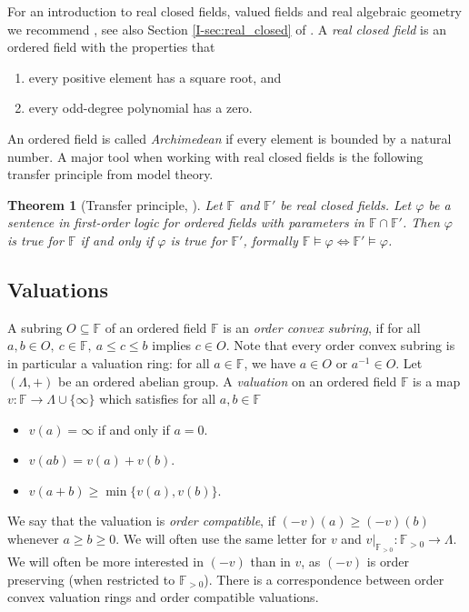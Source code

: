 \documentclass[12pt]{amsart}
\newcommand{\F}{\mathbb{F} }
\numberwithin{equation}{section}
\newtheorem{theorem}{Theorem}[section]
\theoremstyle{remark} %
\begin{document}
 For an introduction to real closed fields, valued fields and real algebraic geometry we recommend  \cite{BCR}, see also Section \ref{I-sec:real_closed} of \cite{AppAGRCF}. A \emph{real closed field} is an ordered field with the properties that 
 \begin{enumerate}
 	\item [(a)] every positive element has a square root, and
 	\item [(b)] every odd-degree polynomial has a zero.
 \end{enumerate}
 An ordered field is called \emph{Archimedean} if every element is bounded by a natural number. A major tool when working with real closed fields is the following transfer principle from model theory. 
 \begin{theorem}[Transfer principle, \cite{BCR}]\label{thm:logic}
 	Let $\F$ and $\F'$ be real closed fields. Let $\varphi$ be a sentence in first-order logic for ordered fields with parameters in $\F \cap \F'$. Then $\varphi$ is true for $\F$ if and only if $\varphi$ is true for $\F'$, formally $\F \models \varphi \iff \F' \models \varphi$.
 \end{theorem}
 
 \subsection{Valuations}
 
 A subring $O \subseteq \F$ of an ordered field $\F$ is an \emph{order convex subring}, if for all $a,b \in O,\  c \in \F, \ a \leq c \leq b $ implies $c \in O$. Note that every order convex subring is in particular a valuation ring: for all $a \in \F$, we have $a \in O$ or $a^{-1} \in O $. Let $(\Lambda,+)$ be an ordered abelian group. A \emph{valuation} on an ordered field $\F$ is a map $v \colon \F \to \Lambda \cup \{\infty\}$ which satisfies for all $a,b \in \F$
 \begin{itemize}
 	\item [(1)] $v(a) = \infty$ if and only if $a = 0$.
 	\item [(2)] $v(ab) = v(a) + v(b)$.
 	\item [(3)] $v(a+b) \geq \min \{ v(a), v(b)\}$. 
 \end{itemize}
 We say that the valuation is \emph{order compatible}, if $(-v)(a) \geq (-v)(b)$ whenever $a \geq b \geq 0$. We will often use the same letter for $v$ and $v|_{\F_{>0}} \colon \F_{>0} \to \Lambda$. We will often be more interested in $(-v)$ than in $v$, as $(-v)$ is order preserving (when restricted to $\F_{>0}$). There is a correspondence between order convex valuation rings and order compatible valuations.
 
\end{document}
